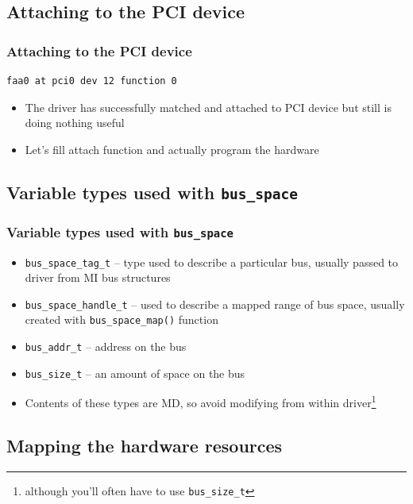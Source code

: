 \documentclass[dvipsnames,table]{beamer}
\begin{document}
\subsection{Attaching to the PCI device}

\begin{frame}[fragile]
\frametitle{Attaching to the PCI device}
\begin{verbatim}
faa0 at pci0 dev 12 function 0
\end{verbatim}
\begin{itemize}
	\item The driver has successfully matched and attached to PCI device but still is doing nothing useful
	\item Let's fill attach function and actually program the hardware
\end{itemize}
\end{frame}

\subsection{Variable types used with {\tt bus\_space}}

\begin{frame}
\frametitle{Variable types used with {\tt bus\_space}}

\begin{itemize}
         \item {\tt bus\_space\_tag\_t} -- type used to describe a particular bus, usually passed to driver from MI bus structures
         \item {\tt bus\_space\_handle\_t} --  used to describe a mapped range of bus space, usually created with {\tt bus\_space\_map()} function
         \item {\tt bus\_addr\_t} -- address on the bus
         \item {\tt bus\_size\_t} -- an amount of space on the bus
         \item Contents of these types are MD, so avoid modifying from within driver\footnote{although you'll often have to use {\tt bus\_size\_t}}
\end{itemize}
\end{frame}


\subsection{Mapping the hardware resources}
\end{document}
